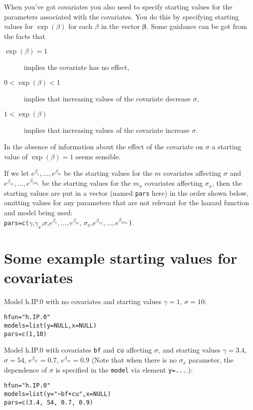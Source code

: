 \documentclass{article}
\begin{document}
When you've got covariates you also need to specify starting values for the parameters associated with the covariates. You do this by specifying starting values for $\exp(\beta)$ for each $\beta$ in the vector $\boldsymbol{\beta}$. Some guidance can be got from the facts that

\begin{description}
\item[$\exp(\beta)=1$] implies the covariate has no effect,
\item[$0<\exp(\beta)<1$] implies that increasing values of the covariate decrease $\sigma$,
\item[$1<\exp(\beta)$] implies that increasing values of the covariate increase $\sigma$.
\end{description}

In the absence of information about the effect of the covariate on $\sigma$ a starting value of $\exp(\beta)=1$ seems sensible. 

If we let $e^{\beta_{1}},\ldots,e^{\beta_{m}}$ be the starting values for the $m$ covariates affecting $\sigma$ and $e^{\beta_{x1}},\ldots,e^{\beta_{xm_x}}$ be the starting values for the $m_x$ covariates affecting $\sigma_x$, then the starting values are put in a vector (named \verb|pars| here) in the order shown below, omitting values for any parameters that are not relevant for the hazard function and model being used:\\
\verb|pars=c(|$\gamma$,$\gamma_x$,$\sigma$,$e^{\beta_{1}},\ldots,e^{\beta_{m}}$, $\sigma_x$,$e^{\beta_{x1}},\ldots,e^{\beta_{xm_x}}$\verb|)|. 



\section{Some example starting values for covariates}

Model h.IP.0 with no covariates and starting values $\gamma=1$, $\sigma=10$:
\begin{verbatim}
hfun="h.IP.0"
models=list(y=NULL,x=NULL)
pars=c(1,10)
\end{verbatim}

\noindent
Model h.IP.0 with covariates \verb|bf| and \verb|cu| affecting $\sigma$, and starting values $\gamma=3.4$, $\sigma=54$, $e^{\beta_{bf}}=0.7$, $e^{\beta_{cu}}=0.9$ (Note that when there is no $\sigma_x$ parameter, the dependence of $\sigma$ is specified in the \verb|model| via element \verb|y=...|.):
\begin{verbatim}
hfun="h.IP.0"
models=list(y="~bf+cu",x=NULL)
pars=c(3.4, 54, 0.7, 0.9)
\end{verbatim}
\end{document}

